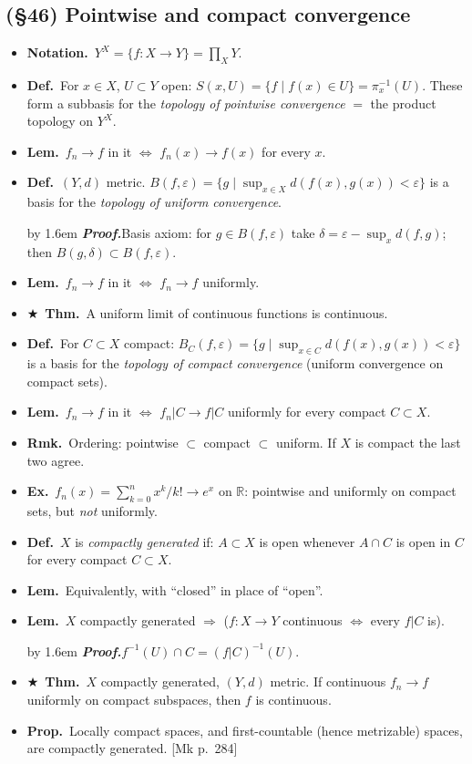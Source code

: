 \documentclass[12pt,a4paper]{article}
\newcommand{\Dfn}{\textbf{Def.}~}
\newcommand{\Thm}{\textbf{Thm.}~}
\newcommand{\Lem}{\textbf{Lem.}~}
\newcommand{\Prp}{\textbf{Prop.}~}
\newcommand{\Exa}{\textbf{Ex.}~}
\newcommand{\Rmk}{\textbf{Rmk.}~}
\newcommand{\Ntn}{\textbf{Notation.}~}
\newcommand{\Key}{$\bigstar$~}                  %
\newcommand{\Mk}[1]{{\footnotesize\textcolor{cue}{[Mk #1]}}}  %
\newcommand{\Pf}[1]{%
  \par\addvspace{7pt}\nopagebreak
  \begingroup
    \advance\leftskip by 1.6em
    \parindent=0pt \small\color{prf}%
    \textbf{\textit{Proof.}}\enspace #1\par
  \endgroup
  \addvspace{9pt}}
\newenvironment{BL}%
  {\begin{itemize}[leftmargin=1.4em,labelsep=0.55em,itemsep=11pt,topsep=11pt,parsep=0pt]}%
  {\end{itemize}}
\newcommand{\RR}{\mathbb{R}}
\renewcommand{\iff}{\Leftrightarrow}
\newcommand{\imp}{\Rightarrow}
\begin{document}
\subsection{(\S46) Pointwise and compact convergence}

\begin{BL}
\item \Ntn $Y^X=\{f\colon X\to Y\}=\prod_{X}Y$.
\item \Dfn For $x\in X$, $U\subset Y$ open: \; $S(x,U)=\{f\mid f(x)\in U\}=\pi_x^{-1}(U)$.
      These form a subbasis for the \emph{topology of pointwise convergence}
      $=$ the product topology on $Y^X$.
\item \Lem $f_n\to f$ in it $\iff$ $f_n(x)\to f(x)$ for every $x$.
\item \Dfn $(Y,d)$ metric. \; $B(f,\varepsilon)=\{g\mid\sup_{x\in X}d(f(x),g(x))<\varepsilon\}$
      is a basis for the \emph{topology of uniform convergence}.
\Pf{Basis axiom: for $g\in B(f,\varepsilon)$ take $\delta=\varepsilon-\sup_x d(f,g)$;
then $B(g,\delta)\subset B(f,\varepsilon)$.}
\item \Lem $f_n\to f$ in it $\iff$ $f_n\to f$ uniformly.
\item \Key\Thm A uniform limit of continuous functions is continuous.
\item \Dfn For $C\subset X$ compact: \;
      $B_C(f,\varepsilon)=\{g\mid\sup_{x\in C}d(f(x),g(x))<\varepsilon\}$ is a basis for the
      \emph{topology of compact convergence} (uniform convergence on compact sets).
\item \Lem $f_n\to f$ in it $\iff$ $f_n|C\to f|C$ uniformly for every compact $C\subset X$.
\item \Rmk Ordering: pointwise $\subset$ compact $\subset$ uniform. If $X$ is compact the last
      two agree.
\item \Exa $f_n(x)=\sum_{k=0}^{n}x^k/k!\to e^x$ on $\RR$: pointwise and uniformly on compact
      sets, but \emph{not} uniformly.
\item \Dfn $X$ is \emph{compactly generated} if: $A\subset X$ is open whenever $A\cap C$ is
      open in $C$ for every compact $C\subset X$.
\item \Lem Equivalently, with ``closed'' in place of ``open''.
\item \Lem $X$ compactly generated $\imp$ ($f\colon X\to Y$ continuous $\iff$ every $f|C$ is).
\Pf{$f^{-1}(U)\cap C=(f|C)^{-1}(U)$.}
\item \Key\Thm $X$ compactly generated, $(Y,d)$ metric. If continuous $f_n\to f$ uniformly on
      compact subspaces, then $f$ is continuous.
\item \Prp Locally compact spaces, and first-countable (hence metrizable) spaces, are
      compactly generated. \Mk{p.\ 284}
\end{BL}
\end{document}

